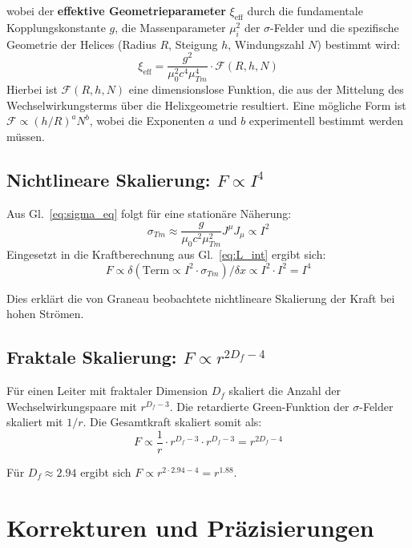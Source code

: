 \documentclass[10pt, a4paper]{article}
\begin{document}
	wobei der \textbf{effektive Geometrieparameter} $\xi_{\text{eff}}$ durch die fundamentale Kopplungskonstante $g$, die Massenparameter $\mu_i^2$ der $\sigma$-Felder und die spezifische Geometrie der Helices (Radius $R$, Steigung $h$, Windungszahl $N$) bestimmt wird:
	\begin{equation}
		\xi_{\text{eff}} = \frac{g^2}{\mu_0^2 c^4 \mu_{Tm}^4} \cdot \mathcal{F}(R, h, N) \label{eq:xi_effective}
	\end{equation}
	Hierbei ist $\mathcal{F}(R, h, N)$ eine dimensionslose Funktion, die aus der Mittelung des Wechselwirkungsterms über die Helixgeometrie resultiert. Eine mögliche Form ist $\mathcal{F} \propto (h/R)^a N^b$, wobei die Exponenten $a$ und $b$ experimentell bestimmt werden müssen.
	
	\subsection{Nichtlineare Skalierung: $F \propto I^4$}
	Aus Gl.~\ref{eq:sigma_eq} folgt für eine stationäre Näherung:
	\begin{equation}
		\sigma_{Tm} \approx \frac{g}{\mu_0 c^2 \mu_{Tm}^2} J^\mu J_\mu \propto I^2
	\end{equation}
	Eingesetzt in die Kraftberechnung aus Gl.~\ref{eq:L_int} ergibt sich:
	\begin{equation}
		F \propto \delta\left(\text{Term} \propto I^2 \cdot \sigma_{Tm}\right)/\delta x \propto I^2 \cdot I^2 = I^4 \label{eq:I4_scaling}
	\end{equation}
	
	Dies erklärt die von Graneau beobachtete nichtlineare Skalierung der Kraft bei hohen Strömen.
	
	\subsection{Fraktale Skalierung: $F \propto r^{2D_f - 4}$}
	Für einen Leiter mit fraktaler Dimension $D_f$ skaliert die Anzahl der Wechselwirkungspaare mit $r^{D_f - 3}$. Die retardierte Green-Funktion der $\sigma$-Felder skaliert mit $1/r$. Die Gesamtkraft skaliert somit als:
	\begin{equation}
		F \propto \frac{1}{r} \cdot r^{D_f - 3} \cdot r^{D_f - 3} = r^{2D_f - 4} \label{eq:fractal_scaling}
	\end{equation}
	
	Für $D_f \approx 2.94$ ergibt sich $F \propto r^{2 \cdot 2.94 - 4} = r^{1.88}$.
	
	\section{Korrekturen und Präzisierungen}
\end{document}
